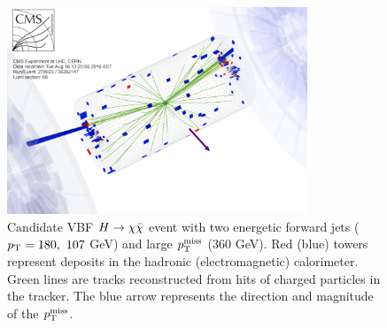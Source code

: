 \begin{figure}[]
    \begin{center}
        \includegraphics[width=0.8\textwidth]{figures/vbf/misc/event_display.png}
        \caption{Candidate VBF $H\rightarrow\chi\bar\chi$ event with two energetic forward jets ($p_\mathrm{T}=180,~107$ GeV) and large $p_\mathrm{T}^\mathrm{miss}$ ($360$ GeV).
                 Red (blue) towers represent deposits in the hadronic (electromagnetic) calorimeter.
                 Green lines are tracks reconstructed from hits of charged particles in the tracker. 
                 The blue arrow represents the direction and magnitude of the $p_\mathrm{T}^\mathrm{miss}$.}
        \label{fig:vbf:ed}
    \end{center}
\end{figure}

